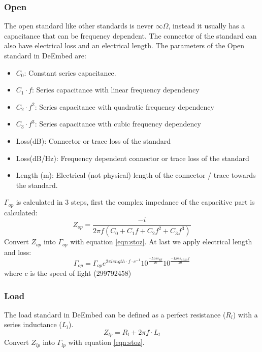 \subsubsection{Open}
\label{sec:openstd}
The open standard like other standards is never $\infty\Omega$, instead it usually has a capacitance that can be frequency dependent. The connector of the standard can also have electrical loss and an electrical length. The parameters of the Open standard in DeEmbed are:
\begin{itemize}
	\item $C_0$: Constant series capacitance.
	\item $C_1 \cdot f$: Series capacitance with linear frequency dependency
	\item $C_2 \cdot f^2$: Series capacitance with quadratic frequency dependency
	\item $C_3 \cdot f^3$: Series capacitance with cubic frequency dependency
	\item Loss(dB): Connector or trace loss of the standard
	\item Loss(dB/Hz): Frequency dependent connector or trace loss of the standard
	\item Length (m): Electrical (not physical) length of the connector / trace towards the standard.
\end{itemize}
$\Gamma_{op}$ is calculated in 3 steps, first the complex impedance of the capacitive part is calculated:
\begin{equation}
Z_{op} = \frac{-i}{2 \pi f (C_0 + C_1 f + C_2 f^2 + C_3 f^3)}
\end{equation}
Convert $Z_{op}$ into $\Gamma_{op}$ with equation \ref{eqn:stoz}. 
At last we apply electrical length and loss:
\begin{equation}
\Gamma_{op} = \Gamma_{op} e^{2 \pi length\cdot f\cdot c^{-1}} 10^{\frac{-Loss_{dB}}{20}} 10^{\frac{-Loss_{dBHz} f }{20}}
\end{equation}
where $c$ is the speed of light (299792458)
\subsubsection{Load}
\label{sec:loadstd}
The load standard in DeEmbed can be defined as a perfect resistance ($R_l$) with a series inductance ($L_l$).
\begin{equation}
Z_{lp} = R_l + 2 \pi f \cdot L_l
\end{equation}
Convert $Z_{lp}$ into $\Gamma_{lp}$ with equation \ref{eqn:stoz}.
